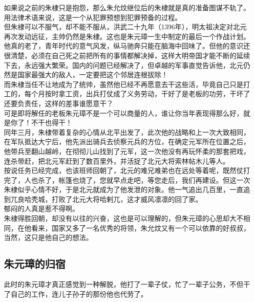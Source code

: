 \begin{multicols}{\theparacolNo}
如果说之前的朱棣只是抱怨，那么朱允炆继位后的朱棣就是真的准备图谋不轨了。用法律术语来说，这是一个从犯罪预想到犯罪预备的过程。\\

但朱棣可以不服气，却不能不服从，洪武二十九年（1396年），明太祖决定对北元再次发动远征，主帅仍然是朱棣。这也是朱元璋一生中制定的最后一个作战计划。\\

他真的老了，青年时代的意气风发，纵马驰奔只能在脑海中回味了。但他的意识还很清楚，必须在自己死之前把所有的事情都解决掉，这样大明帝国才能不断的延续下去，永远强大繁荣。国内的问题已经解决了，但卓越的军事直觉告诉他，北元仍然是国家最强大的敌人，一定要把这个邻居连根拔除！\\

而朱棣当任不让地成为了统帅，虽然他已经不再愿意去干这些活，毕竟自己只是打工的，每个月按时拿工资，出兵打仗成了义务劳动，干好了是老板的功劳，干坏了还要负责任，这样的差事谁愿意干？\\

可是即将解任的老板朱元璋不是一个可以商量的人，谁让你当年表现得那么好，就是你了！不干也得干！\\

同年三月，朱棣带着复杂的心情从北平出发了，此次他的战略和上一次大致相同，在军队抵达大宁后，他先派出骑兵去侦察元兵的方位，在确定元军所在位置之后，他带兵至翻山越岭，在彻彻儿山找到了元军，这一次他没有再玩怀柔的那套把戏，连杀带赶，把北元军赶到了数百里外，并活捉了北元大将索林帖木儿等人。\\

按说任务已经完成，也该班师回朝了，北元的难兄难弟也在远处等着呢，既然仗打完了，人也杀了，帐篷也烧了，您就早点走吧，等您走后，我们再建设。但这一次朱棣似乎心情不好，于是北元就成为了他发泄的对象。他一气追出几百里，一直追到兀良哈秃城，打败了北元大将哈剌兀，这才威风凛凛的回了家。\\

郁闷的人真是惹不得啊。\\

朱棣得胜回朝，却没有以往的兴奋，这也是可以理解的，但朱元璋的心思却大不相同，在他看来，国家又多了一名优秀的将领，朱允炆又有一个可以依靠的好叔叔，当然，这只是他自己的想法。\\

\subsection{朱元璋的归宿}
此时的朱元璋才真正感觉到一种解脱，他打了一辈子仗，忙了一辈子公务，不但干了自己的工作，连儿子孙子的那份他也代劳了。\\


\end{multicols}
